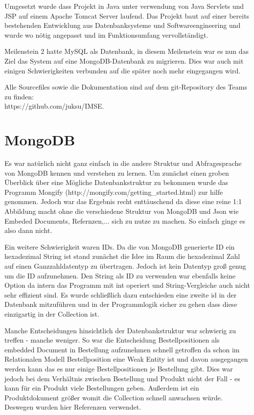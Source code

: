 \documentclass[a4paper]{article}
\begin{document}
Umgesetzt wurde dass Projekt in Java unter verwendung von Java Servlets und JSP auf einem Apache Tomcat Server laufend. Das Projekt baut auf einer bereits bestehenden Entwicklung aus Datenbanksysteme und Softwareengineering und wurde wo nötig angepasst und im Funktionsumfang vervollständigt.

Meilenstein 2 hatte MySQL als Datenbank, in diesem Meilenstein war es nun das Ziel das System auf eine MongoDB-Datenbank zu migrieren. Dies war auch mit einigen Schwierigkeiten verbunden auf die später noch mehr eingegangen wird.

Alle Sourcefiles sowie die Dokumentation sind auf dem git-Repository des Teams zu finden: \\ https://github.com/juksu/IMSE.

\section*{MongoDB}
Es war natürlich nicht ganz einfach in die andere Struktur und Abfragesprache von MongoDB kennen und verstehen zu lernen. Um zunächst einen groben Überblick über eine Mögliche Datenbankstruktur zu bekommen wurde das Programm Mongify (http://mongify.com/getting\_started.html) zur hilfe genommen. Jedoch war das Ergebnis recht enttäuschend da diese eine reine 1:1 Abbildung macht ohne die verschiedene Struktur von MongoDB und Json wie Embeded Documents, Refernzen,... sich zu nutze zu machen. So einfach ginge es also dann nicht.

Ein weitere Schwierigkeit waren IDs. Da die von MongoDB generierte ID ein hexadezimal String ist stand zunächst die Idee im Raum die hexadezimal Zahl auf einen Ganzzahldatentyp zu übertragen. Jedoch ist kein Datentyp groß genug um die ID aufzunehmen. Den String als ID zu verwenden war ebenfalls keine Option da intern das Programm mit int operiert und String-Vergleiche auch nicht sehr effizient sind. Es wurde schließlich dazu entschieden eine zweite id in der Datenbank mitzuführen und in der Programmlogik sicher zu gehen dass diese einzigartig in der Collection ist.

Manche Entscheidungen hinsichtlich der Datenbankstruktur war schwierig zu treffen - manche weniger. So war die Entscheidung Bestellpositionen als embedded Document in Bestellung aufzunehmen schnell getroffen da schon im Relationalen Modell Bestellposition eine Weak Entity ist und davon ausgegangen werden kann das es nur einige Bestellpositionen je Bestellung gibt. Dies war jedoch bei dem Verhältnis zwischen Bestellung und Produkt nicht der Fall - es kann für ein Produkt viele Bestellungen geben. Außerdem ist ein Produktdokument größer womit die Collection schnell anwachsen würde. Deswegen wurden hier Referenzen verwendet.
\end{document}
